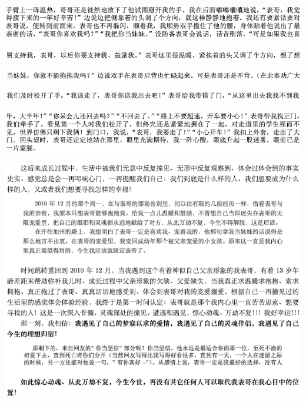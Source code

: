 \documentclass[9pt, b5paper]{article}
\begin{document}
\begin{center}
\includegraphics[width=.9\linewidth]{./pic/backups_plans_20210511_120655.png}
\end{center}

\begin{center}
\includegraphics[width=.9\linewidth]{./pic/backups_plans_20210511_120730.png}
\end{center}

\begin{center}
\includegraphics[width=.9\linewidth]{./pic/backups_plans_20210511_120816.png}
\end{center}

\begin{center}
\includegraphics[width=.9\linewidth]{./pic/backups_plans_20210511_120902.png}
\end{center}

\begin{center}
\includegraphics[width=.9\linewidth]{./pic/backups_plans_20210511_120952.png}
\end{center}

\begin{center}
\includegraphics[width=.9\linewidth]{./pic/backups_plans_20210511_121705.png}
\end{center}
\end{document}
